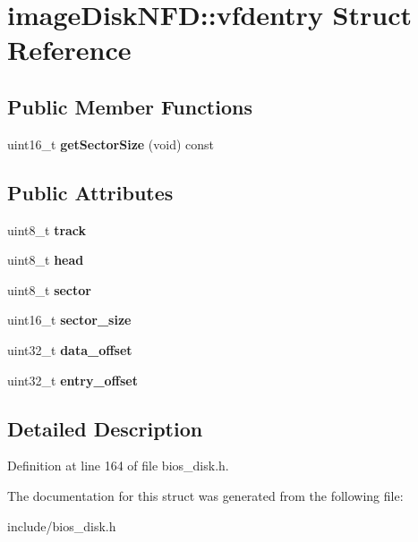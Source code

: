 \hypertarget{structimageDiskNFD_1_1vfdentry}{\section{image\-Disk\-N\-F\-D\-:\-:vfdentry Struct Reference}
\label{structimageDiskNFD_1_1vfdentry}
}
\subsection*{Public Member Functions}
\begin{DoxyCompactItemize}
\item 
\hypertarget{structimageDiskNFD_1_1vfdentry_a12bf8e217dd12b933e9e508d3d1d2115}{uint16\-\_\-t {\bfseries get\-Sector\-Size} (void) const }\label{structimageDiskNFD_1_1vfdentry_a12bf8e217dd12b933e9e508d3d1d2115}

\end{DoxyCompactItemize}
\subsection*{Public Attributes}
\begin{DoxyCompactItemize}
\item 
\hypertarget{structimageDiskNFD_1_1vfdentry_aead7c9ba94160f13dcf012c7adf5b8ef}{uint8\-\_\-t {\bfseries track}}\label{structimageDiskNFD_1_1vfdentry_aead7c9ba94160f13dcf012c7adf5b8ef}

\item 
\hypertarget{structimageDiskNFD_1_1vfdentry_a132e27d1df33c47c37235e7958e3301d}{uint8\-\_\-t {\bfseries head}}\label{structimageDiskNFD_1_1vfdentry_a132e27d1df33c47c37235e7958e3301d}

\item 
\hypertarget{structimageDiskNFD_1_1vfdentry_affe7d792cd3b0d3cf2ec1578a0858541}{uint8\-\_\-t {\bfseries sector}}\label{structimageDiskNFD_1_1vfdentry_affe7d792cd3b0d3cf2ec1578a0858541}

\item 
\hypertarget{structimageDiskNFD_1_1vfdentry_a6e26dac70e9c36939eede2b5540e120a}{uint16\-\_\-t {\bfseries sector\-\_\-size}}\label{structimageDiskNFD_1_1vfdentry_a6e26dac70e9c36939eede2b5540e120a}

\item 
\hypertarget{structimageDiskNFD_1_1vfdentry_a47065ee2a3e3c590c6617e5855d054f8}{uint32\-\_\-t {\bfseries data\-\_\-offset}}\label{structimageDiskNFD_1_1vfdentry_a47065ee2a3e3c590c6617e5855d054f8}

\item 
\hypertarget{structimageDiskNFD_1_1vfdentry_a17429a540fce1558b87fcc735f56c88f}{uint32\-\_\-t {\bfseries entry\-\_\-offset}}\label{structimageDiskNFD_1_1vfdentry_a17429a540fce1558b87fcc735f56c88f}

\end{DoxyCompactItemize}


\subsection{Detailed Description}


Definition at line 164 of file bios\-\_\-disk.\-h.



The documentation for this struct was generated from the following file\-:\begin{DoxyCompactItemize}
\item 
include/bios\-\_\-disk.\-h\end{DoxyCompactItemize}
